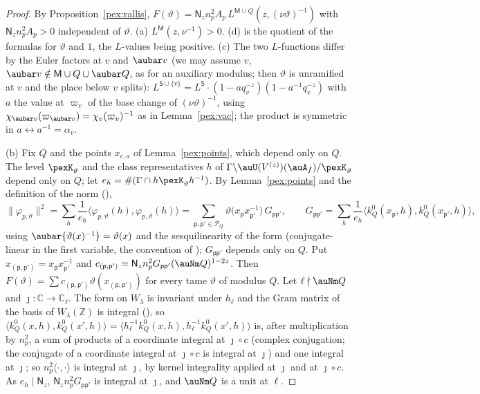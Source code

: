 \documentclass[10pt]{amsart}
\theoremstyle{definition}
\theoremstyle{remark}
\newcommand{\C}{\mathbb C}
\newcommand{\Z}{\mathbb Z}
\begin{document}
\begin{proof}
By Proposition~\ref{pex:rallis}, $F(\vartheta)=\mathsf N_zn_p^2A_p\,L^{\mathsf M\cup Q}(z,(\nu\vartheta)^{-1})$
with $\mathsf N_zn_p^2A_p>0$ independent of $\vartheta$. (a) $L^{\mathsf M}(z,\nu^{-1})>0$. (d) is the
quotient of the formulas for $\vartheta$ and $1$, the $L$-values being positive. (c) The two
$L$-functions differ by the Euler factors at $v$ and $\aubar v$ (we may assume $v$, $\aubar v\notin
\mathsf M\cup Q\cup\aubar Q$, as for an auxiliary modulus; then $\vartheta$ is unramified at $v$ and the
place below $v$ splits): $L^{\mathsf S\cup\{v\}}=L^{\mathsf S}\cdot(1-aq_v^{-z})(1-a^{-1}q_v^{-z})$ with
$a$ the value at $\varpi_v$ of the base change of $(\nu\vartheta)^{-1}$, using
$\chi_{\aubar v}(\varpi_{\aubar v})=\chi_v(\varpi_v)^{-1}$ as in Lemma~\ref{pex:vac}; the product is
symmetric in $a\leftrightarrow a^{-1}=\alpha_v$.

(b) Fix $Q$ and the points $x_{c,a}$ of Lemma~\ref{pex:points}, which depend only on $Q$. The level
$\pexK_\vartheta$ and the class representatives $h$ of $\Gamma\backslash\auU(V^{(z)})(\auA_f)/\pexK_\vartheta$
depend only on $Q$; let $e_h=\#(\Gamma\cap h\pexK_\vartheta h^{-1})$. By Lemma~\ref{pex:points} and the
definition of the norm ({\cite[\S14.3]{P46}}),
\[
\|\varphi_{p,\vartheta}\|^2=\sum_h\frac1{e_h}\bigl\langle\varphi_{p,\vartheta}(h),\varphi_{p,\vartheta}(h)
\bigr\rangle=\sum_{\mathsf p,\mathsf p'\in\mathcal P_Q}\vartheta\bigl(x_{\mathsf p}x_{\mathsf p'}^{-1}\bigr)
\,G_{\mathsf p\mathsf p'},\qquad G_{\mathsf p\mathsf p'}=\sum_h\frac1{e_h}\bigl\langle k^0_Q(x_{\mathsf
p},h),k^0_Q(x_{\mathsf p'},h)\bigr\rangle,
\]
using $\aubar{\vartheta(x)^{-1}}=\vartheta(x)$ and the sesquilinearity of the form (conjugate-linear in
the first variable, the convention of {\cite[\S2.3]{P53}}); $G_{\mathsf p\mathsf p'}$ depends only on $Q$. Put $x_{(\mathsf p,\mathsf
p')}=x_{\mathsf p}x_{\mathsf p'}^{-1}$ and $c_{(\mathsf p,\mathsf p')}=\mathsf N_zn_p^2G_{\mathsf p\mathsf
p'}(\auNm Q)^{1-2z}$. Then $F(\vartheta)=\sum c_{(\mathsf p,\mathsf p')}\vartheta(x_{(\mathsf p,\mathsf
p')})$ for every tame $\vartheta$ of modulus $Q$. Let $\ell\nmid\auNm Q$ and $\jmath\colon\C\to\C_\ell$.
The form on $W_\lambda$ is invariant under $h_\ell$ and the Gram matrix of the basis of $W_\lambda(\Z)$ is integral ({\cite[\S14.3]{P46}}), so
$\langle k^0_Q(x,h),k^0_Q(x',h)\rangle=\langle h_\ell^{-1}k^0_Q(x,h),h_\ell^{-1}k^0_Q(x',h)\rangle$ is,
after multiplication by $n_p^2$, a sum of products of a coordinate integral at $\jmath\circ c$ (complex
conjugation; the conjugate of a coordinate integral at $\jmath\circ c$ is integral at $\jmath$) and one
integral at $\jmath$; so $n_p^2\langle\cdot,\cdot\rangle$ is integral at $\jmath$, by kernel
integrality applied at $\jmath$ and at $\jmath\circ c$. As $e_h\mid\mathsf N_z$, $\mathsf N_zn_p^2G_{\mathsf
p\mathsf p'}$ is integral at $\jmath$, and $\auNm Q$ is a unit at $\ell$.
\end{proof}
\end{document}
